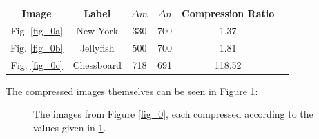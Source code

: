 \documentclass[a4paper,10pt,english]{article}
\begin{document}
\begin{multicols*}{2}
\begin{table}[H]
\center
\begin{tabular}{c c c c c c}
\textbf{Image} & \textbf{Label} & $\Delta m$ & $\Delta n$ & \textbf{Compression Ratio}\\
Fig. \ref{fig_0a} & New York & 330 & 700 & 1.37 \\
Fig. \ref{fig_0b} & Jellyfish & 500 & 700 & 1.81 \\
Fig. \ref{fig_0c} & Chessboard & 718 & 691 & 118.52
\end{tabular}
\caption{\label{table_0}}
\end{table}

The compressed images themselves can be seen in Figure \ref{fig_2}:
\end{multicols*}

\begin{figure}[H]
 \centering
   	\qquad
    \caption{The images from Figure \ref{fig_0}, each compressed according to the values given in \ref{table_0}.\label{fig_2}}
\end{figure}
\end{document}
